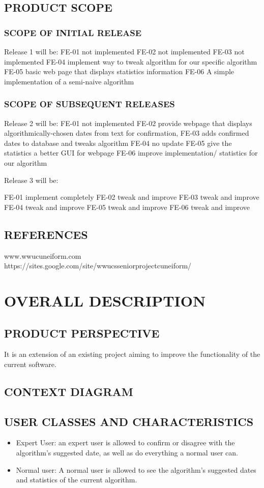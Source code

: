 \documentclass[11pt]{article}
\begin{document}
\subsection{PRODUCT SCOPE}
\subsubsection{SCOPE OF INITIAL RELEASE}
Release 1 will be:
FE-01 not implemented
FE-02 not implemented
FE-03 not implemented
FE-04 implement way to tweak algorithm for our specific algorithm
FE-05 basic web page that displays statistics information
FE-06 A simple implementation of a semi-naive algorithm

\subsubsection{SCOPE OF SUBSEQUENT RELEASES}
Release 2 will be:
FE-01 not implemented
FE-02 provide webpage that displays algorithmically-chosen dates from text for confirmation,
FE-03 adds confirmed dates to database and tweaks algorithm
FE-04 no update
FE-05 give the statistics a better GUI for webpage
FE-06 improve implementation/ statistics for our algorithm

Release 3 will be:

FE-01 implement completely
FE-02 tweak and improve
FE-03 tweak and improve
FE-04 tweak and improve
FE-05  tweak and improve
FE-06  tweak and improve

\subsection{REFERENCES}
www.wwucuneiform.com
https://sites.google.com/site/wwucsseniorprojectcuneiform/

\section{OVERALL DESCRIPTION}
\subsection{PRODUCT PERSPECTIVE}
It is an extension of an existing project aiming to improve the functionality of the current software.

\subsection{CONTEXT DIAGRAM}

\subsection{USER CLASSES AND CHARACTERISTICS}
\begin{itemize}
    \item Expert User: an expert user is allowed to confirm or disagree with the algorithm’s suggested date, as well as do everything a normal user can.
    \item Normal user: A normal user is allowed to see the algorithm’s suggested dates and statistics of the current algorithm.
\end{itemize}
\end{document}
